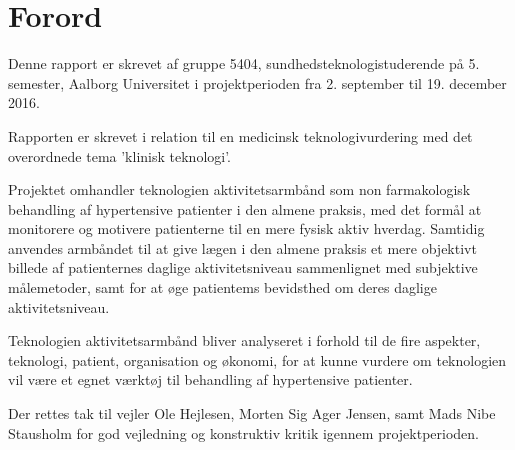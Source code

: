 \chapter*{Forord}

Denne rapport er skrevet af gruppe 5404, sundhedsteknologistuderende på 5. semester, Aalborg Universitet i projektperioden fra 2. september til 19. december 2016.

Rapporten er skrevet i relation til en medicinsk teknologivurdering med det overordnede tema 'klinisk teknologi'. 

Projektet omhandler teknologien aktivitetsarmbånd som non farmakologisk behandling af hypertensive patienter i den almene praksis, med det formål at monitorere og motivere patienterne til en mere fysisk aktiv hverdag. Samtidig anvendes armbåndet til at give lægen i den almene praksis et mere objektivt billede af patienternes daglige aktivitetsniveau sammenlignet med subjektive målemetoder, samt for at øge patientems bevidsthed om deres daglige aktivitetsniveau. 

Teknologien aktivitetsarmbånd bliver analyseret i forhold til de fire aspekter, teknologi, patient, organisation og økonomi, for at kunne vurdere om teknologien vil være et egnet værktøj til behandling af hypertensive patienter.

Der rettes tak til vejler Ole Hejlesen, Morten Sig Ager Jensen, samt Mads Nibe Stausholm for god vejledning og konstruktiv kritik igennem projektperioden. \\\\\\\\\\


